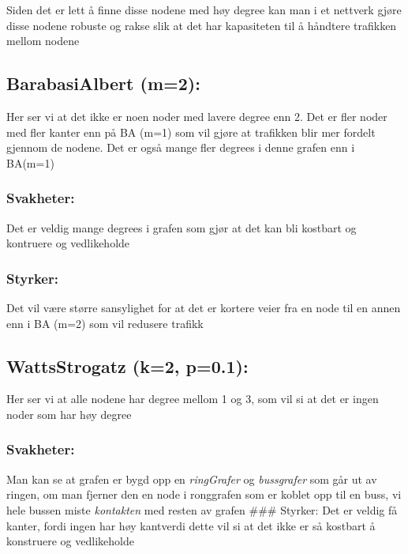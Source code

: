 \documentclass[11pt]{article}
\begin{document}
Siden det er lett å finne disse nodene med høy degree kan man i et
nettverk gjøre disse nodene robuste og rakse slik at det har kapasiteten
til å håndtere trafikken mellom nodene

\hypertarget{barabasialbert-m2}{%
\subsection*{BarabasiAlbert (m=2):}\label{barabasialbert-m2}}

Her ser vi at det ikke er noen noder med lavere degree enn 2. Det er
fler noder med fler kanter enn på BA (m=1) som vil gjøre at trafikken
blir mer fordelt gjennom de nodene. Det er også mange fler degrees i
denne grafen enn i BA(m=1)

\hypertarget{svakheter-1}{%
\subsubsection*{Svakheter:}\label{svakheter-1}}

Det er veldig mange degrees i grafen som gjør at det kan bli kostbart og
kontruere og vedlikeholde

\hypertarget{styrker-1}{%
\subsubsection*{Styrker:}\label{styrker-1}}

Det vil være større sansylighet for at det er kortere veier fra en node
til en annen enn i BA (m=2) som vil redusere trafikk

\hypertarget{wattsstrogatz-k2-p0.1}{%
\subsection*{WattsStrogatz (k=2, p=0.1):}\label{wattsstrogatz-k2-p0.1}}

Her ser vi at alle nodene har degree mellom 1 og 3, som vil si at det er
ingen noder som har høy degree

\hypertarget{svakheter-2}{%
\subsubsection*{Svakheter:}\label{svakheter-2}}

Man kan se at grafen er bygd opp en \emph{ringGrafer} og
\emph{bussgrafer} som går ut av ringen, om man fjerner den en node i
ronggrafen som er koblet opp til en buss, vi hele bussen miste
\emph{kontakten} med resten av grafen \#\#\# Styrker: Det er veldig få
kanter, fordi ingen har høy kantverdi dette vil si at det ikke er så
kostbart å konstruere og vedlikeholde
\end{document}
